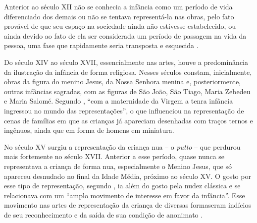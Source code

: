 Anterior ao século XII não se conhecia a infância como um período de vida diferenciado dos demais ou não se tentava representá-la nas obras, pelo fato provável de que seu espaço na sociedade ainda não estivesse estabelecido\footnotemark, ou ainda devido ao fato de ela ser considerada um período de passagem na vida da pessoa, uma fase que rapidamente seria transposta e esquecida \cite{ARIES2011}.


Do século XIV ao século XVII, essencialmente nas artes, houve a predominância da ilustração da infância de forma religiosa. Nesses séculos constam, inicialmente, obras da figura do menino Jesus, da Nossa Senhora menina e, posteriormente, outras infâncias sagradas, com as figuras de São João, São Tiago, Maria Zebedeu e Maria Salomé. Segundo , ``com a maternidade da Virgem a tenra infância ingressou no mundo das representações'', o que influenciou na representação de cenas de famílias em que as crianças já apareciam desenhadas com traços ternos e ingênuos, ainda que em forma de homens em miniatura. 

No século XV surgiu a representação da criança nua -- o \emph{putto} -- que perdurou mais fortemente no século XVII. Anterior a esse período, quase nunca se representava a criança de forma nua, especialmente o Menino Jesus, que só apareceu desnudado no final da Idade Média, próximo ao século XV. O gosto por esse tipo de representação, segundo , ia além do gosto pela nudez clássica e se relacionava com um ``amplo movimento de interesse em favor da infância''. Esse movimento nas artes de representação da criança de diversas formas\footnotemark eram indícios de seu reconhecimento e da saída de sua condição de anonimato \cite{ARIES1981}.


